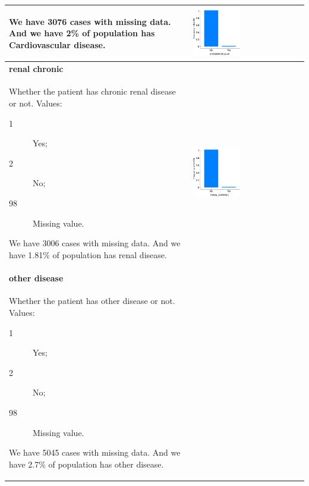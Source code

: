 \begin{longtable}{P{0.45\textwidth}P{0.45\textwidth}}
\begin{description}
\end{description}
We have 3076 cases with missing data.
And we have 2\% of population has Cardiovascular disease.
& \includegraphics[width=0.44\textwidth]{img/appendix/feature_cardiovascular.png} 
\\ \hline
\textbf{renal chronic} & \\
Whether the patient has chronic renal disease or not. Values:
\begin{description}
    \item[1] Yes;
    \item[2] No;
    \item[98] Missing value.
\end{description}
We have 3006 cases with missing data.
And we have 1.81\% of population has renal disease.
& \includegraphics[width=0.44\textwidth]{img/appendix/feature_renal.png} 
\\ \hline
\textbf{other disease} & \\
Whether the patient has other disease or not. Values:
\begin{description}
    \item[1] Yes;
    \item[2] No;
    \item[98] Missing value.
\end{description}
We have 5045 cases with missing data.
And we have 2.7\% of population has other disease.

\end{longtable}

